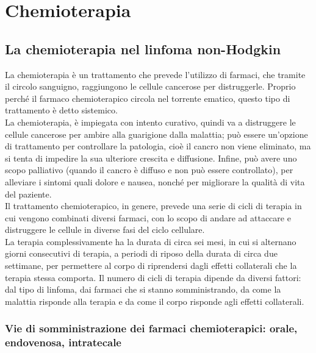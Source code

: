 \chapter{Chemioterapia}

\section{La chemioterapia nel linfoma non-Hodgkin}

La chemioterapia è un trattamento che prevede l’utilizzo di farmaci, che tramite il 
circolo sanguigno, raggiungono le cellule cancerose per distruggerle\cite{CHEMOUK}.
Proprio perché il farmaco chemioterapico circola nel torrente ematico, questo tipo di trattamento è detto sistemico.\\ 
La chemioterapia, è impiegata con intento curativo, quindi va a distruggere le cellule cancerose per ambire alla 
guarigione dalla malattia; può essere un’opzione di trattamento per controllare la patologia, cioè il cancro non 
viene eliminato, ma si tenta di impedire la sua ulteriore crescita e diffusione. Infine, può avere uno scopo 
palliativo (quando il cancro è diffuso e non può essere controllato), per alleviare 
i sintomi quali dolore e nausea, nonché per migliorare la qualità di vita del paziente\cite{CHEMOAMERICAN}.\\
Il trattamento chemioterapico, in genere, prevede una serie di cicli di terapia in cui vengono combinati diversi 
farmaci, con lo scopo di andare ad attaccare e distruggere le cellule in diverse fasi del ciclo cellulare\cite{LYMPHACTION}.\\
La terapia complessivamente ha la durata di circa sei mesi, in cui si alternano giorni consecutivi di terapia, 
a periodi di riposo della durata di circa due settimane, per permettere al corpo di riprendersi dagli effetti 
collaterali che la terapia stessa comporta. Il numero di cicli di terapia dipende da diversi fattori: dal tipo di 
linfoma, dai farmaci che si stanno somministrando, da come la malattia risponde alla terapia e
da come il corpo risponde agli effetti collaterali\cite{CHEMOUK}.

\subsection{Vie di somministrazione dei farmaci chemioterapici: orale, endovenosa, intratecale}

